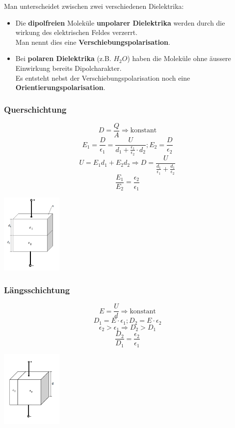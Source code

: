 Man unterscheidet zwischen zwei verschiedenen Dielektrika:
\begin{itemize}
	\item Die \textbf{dipolfreien} Moleküle \textbf{unpolarer Dielektrika} werden durch die wirkung des elektrischen Feldes verzerrt. \\
	Man nennt dies eine \textbf{Verschiebungspolarisation}.
	\item Bei \textbf{polaren Dielektrika} (z.B. $H_2O$) haben die Moleküle ohne äussere Einwirkung bereits Dipolcharakter. \\
	Es entsteht nebst der Verschiebungspolarisation noch eine \textbf{Orientierungspolarisation}.
\end{itemize}

\parbox[t]{10.5cm} {
	\subsubsection{Querschichtung}
	\parbox[h]{6cm}{
		$$D = \frac{Q}{A} \Rightarrow \text{konstant}$$ 
		$$E_1 = \frac{D}{\epsilon_1}  = \frac{U}{d_1 + \frac{\epsilon_1}{\epsilon_2} \cdot d_2}; E_2 = \frac{D}{\epsilon_2}$$
		$$U = E_1 d_1 + E_2 d_2 \Rightarrow D = \frac{U}{\frac{d_1}{\epsilon_1} + \frac{d_1}		
			{\epsilon_2}}$$
		$$\frac{E_1}{E_2} = \frac{\epsilon_2}{\epsilon_1}$$
	}
	\parbox[h]{4cm}{
		\includegraphics[width=3cm]{./bilder/schichtung_quer.png}
	}
}
\parbox[t]{10cm} {
	\subsubsection{Längsschichtung}
	\parbox[h]{5cm}{
		$$E = \frac{U}{d} \Rightarrow \text{konstant}$$
		$$D_1 = E \cdot {\epsilon_1} ; D_2 = E \cdot {\epsilon_2}$$
		$$\epsilon_2 > \epsilon_1 \Rightarrow D_2 > D_1$$
		$$\frac{D_2}{D_1} = \frac{\epsilon_2}{\epsilon_1}$$
	}
	\parbox[h]{4cm}{
		\includegraphics[width=3cm]{./bilder/schichtung_laengs.png}
	}
}

